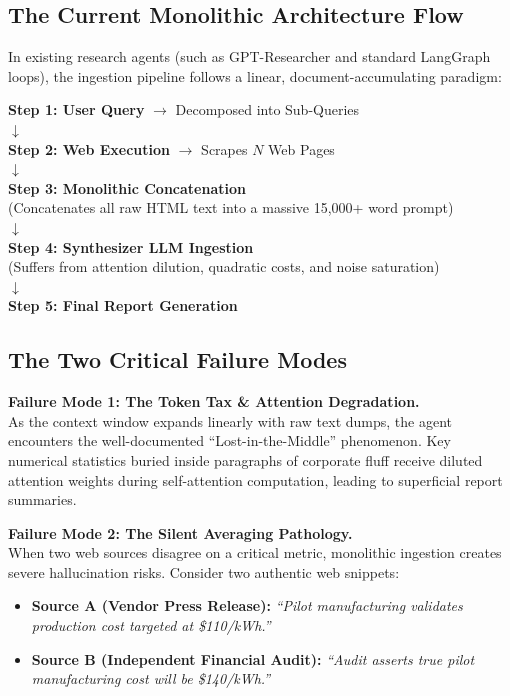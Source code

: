 \documentclass[10pt,twocolumn,letterpaper]{article}
\begin{document}
\subsection{The Current Monolithic Architecture Flow}
In existing research agents (such as GPT-Researcher and standard LangGraph loops), the ingestion pipeline follows a linear, document-accumulating paradigm:

\begin{tcolorbox}[colback=gray!5,colframe=black!60,title=\textbf{Current Monolithic Research Architecture},fonttitle=\small\bfseries]
\small
\textbf{Step 1: User Query} $\rightarrow$ Decomposed into Sub-Queries \\
$\downarrow$ \\
\textbf{Step 2: Web Execution} $\rightarrow$ Scrapes $N$ Web Pages \\
$\downarrow$ \\
\textbf{Step 3: Monolithic Concatenation} \\
(Concatenates all raw HTML text into a massive 15,000+ word prompt) \\
$\downarrow$ \\
\textbf{Step 4: Synthesizer LLM Ingestion} \\
(Suffers from attention dilution, quadratic costs, and noise saturation) \\
$\downarrow$ \\
\textbf{Step 5: Final Report Generation}
\end{tcolorbox}

\subsection{The Two Critical Failure Modes}

\textbf{Failure Mode 1: The Token Tax \& Attention Degradation.} \\
As the context window expands linearly with raw text dumps, the agent encounters the well-documented ``Lost-in-the-Middle'' phenomenon. Key numerical statistics buried inside paragraphs of corporate fluff receive diluted attention weights during self-attention computation, leading to superficial report summaries.

\textbf{Failure Mode 2: The Silent Averaging Pathology.} \\
When two web sources disagree on a critical metric, monolithic ingestion creates severe hallucination risks. Consider two authentic web snippets:
\begin{itemize}
    \item \textbf{Source A (Vendor Press Release):} \textit{``Pilot manufacturing validates production cost targeted at \$110/kWh.''}
    \item \textbf{Source B (Independent Financial Audit):} \textit{``Audit asserts true pilot manufacturing cost will be \$140/kWh.''}
\end{itemize}
\end{document}
